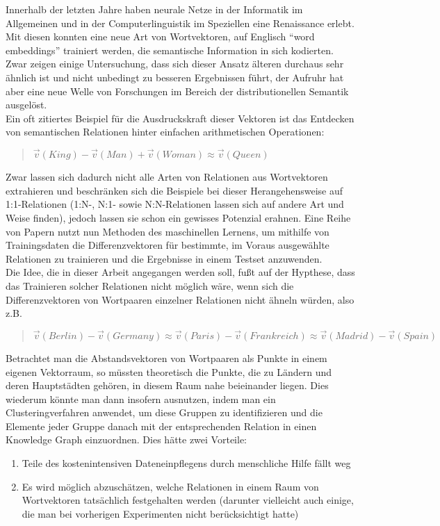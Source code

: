 Innerhalb der letzten Jahre haben neurale Netze in der Informatik im Allgemeinen und in der Computerlinguistik im Speziellen
eine Renaissance erlebt. Mit diesen konnten eine neue Art von Wortvektoren, auf Englisch ``word embeddings'' trainiert werden,
die semantische Information in sich kodierten. Zwar zeigen einige Untersuchung, dass sich dieser Ansatz älteren durchaus sehr
ähnlich ist und nicht unbedingt zu besseren Ergebnissen führt, der Aufruhr hat aber eine neue Welle von Forschungen im Bereich
der distributionellen Semantik ausgelöst.\\
Ein oft zitiertes Beispiel für die Ausdruckskraft dieser Vektoren ist das Entdecken von
semantischen Relationen hinter einfachen arithmetischen Operationen:

\begin{quote}
  $\vec{v}(King) - \vec{v}(Man) + \vec{v}(Woman) \approx \vec{v}(Queen)$
\end{quote}

Zwar lassen sich dadurch nicht alle Arten von Relationen aus Wortvektoren extrahieren und beschränken sich die Beispiele
bei dieser Herangehensweise auf 1:1-Relationen (1:N-, N:1- sowie N:N-Relationen lassen sich auf andere Art und Weise finden),
jedoch lassen sie schon ein gewisses Potenzial erahnen. Eine Reihe von Papern nutzt nun Methoden des maschinellen Lernens,
um mithilfe von Trainingsdaten die Differenzvektoren für bestimmte, im Voraus ausgewählte Relationen zu trainieren und die Ergebnisse
in einem Testset anzuwenden. \\
Die Idee, die in dieser Arbeit angegangen werden soll, fußt auf der Hypthese, dass das Trainieren solcher Relationen nicht
möglich wäre, wenn sich die Differenzvektoren von Wortpaaren einzelner Relationen nicht ähneln würden, also z.B.

\begin{quote}
  $\vec{v}(Berlin) - \vec{v}(Germany) \approx \vec{v}(Paris) - \vec{v}(Frankreich) \approx \vec{v}(Madrid) - \vec{v}(Spain)$
\end{quote}

Betrachtet man die Abstandsvektoren von Wortpaaren als Punkte in einem eigenen Vektorraum, so müssten theoretisch die Punkte,
die zu Ländern und deren Hauptstädten gehören, in diesem Raum nahe beieinander liegen. Dies wiederum könnte man dann insofern
ausnutzen, indem man ein Clusteringverfahren anwendet, um diese Gruppen zu identifizieren und die Elemente jeder Gruppe danach
mit der entsprechenden Relation in einen Knowledge Graph einzuordnen. Dies hätte zwei Vorteile:
\begin{enumerate}
  \item Teile des kostenintensiven Dateneinpflegens durch menschliche Hilfe fällt weg
  \item Es wird möglich abzuschätzen, welche Relationen in einem Raum von Wortvektoren tatsächlich festgehalten werden
        (darunter vielleicht auch einige, die man bei vorherigen Experimenten nicht berücksichtigt hatte)
\end{enumerate}

